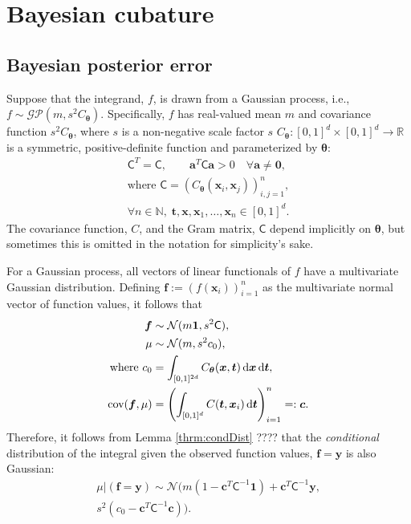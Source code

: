 \documentclass[twocolumn]{svjour3}          %
\newcommand{\bm}[1]{\boldsymbol{#1}}
\newcommand{\dif}[1]{\text{d}{#1}}
\newcommand{\D}[1]{\text{d}{#1}}
\newcommand{\vtheta}{{\bm{\theta}}}
\newcommand{\va}{\bm{a}}
\newcommand{\vc}{\bm{c}}
\newcommand{\vf}{\bm{f}}
\newcommand{\vt}{\bm{t}}
\newcommand{\vx}{\bm{x}}
\newcommand{\vy}{\bm{y}}
\newcommand{\vzero}{\bm{0}}
\newcommand{\vone}{\bm{1}}
\newcommand{\mC}{\mathsf{C}}
\newcommand{\cov}{{\textup{cov}}}
\newcommand{\calN}{\mathcal{N}}
\begin{document}
\section{Bayesian cubature} \label{sec:BC}
\label{sec:1}

\subsection{Bayesian posterior error}
\label{sec:BayesPostErr}

Suppose that the integrand, $f$, is drawn from a Gaussian process, i.e., $f \sim \mathcal{GP}(m,s^2 C_\vtheta)$.  Specifically, $f$ has real-valued mean $m$ and covariance function $s^2C_\vtheta$, where $s$ is a non-negative scale factor $s$ $C_\vtheta: [0,1]^d \times [0,1]^d \to \mathbb{R} $ is a symmetric, positive-definite function and parameterized by $\vtheta$:
\begin{multline} \label{FJH:eq:CondPosDef}
\mC^T = \mC,  \qquad \va^T \mC \va > 0 \quad  \forall \va \ne \vzero, 
\\ \text{where } \mC = \left(  C_\vtheta(\vx_i,\vx_j)  \right)_{i,j=1}^n,\\
\forall n\in \mathbb{N}, \; \vt, \vx, \vx_1, \ldots, \vx_n \in [0,1]^d.
\end{multline}
The covariance function, $C$, and the Gram matrix, $\mC$ depend implicitly on $\vtheta$, but sometimes this is omitted in the notation for simplicity's sake.

For a Gaussian process, all vectors of linear functionals of $f$ have a multivariate Gaussian distribution. Defining  $\vf  := \left( f(\vx_i)\right)_{i=1}^n$ as the multivariate normal vector of function values, it follows that 
\begin{subequations}
\begin{align}
\label{eqn:fGaussDist}
\vf  & \sim \calN(m \vone, s^2 \mC), \\
\mu & \sim \calN(m, s^2 c_0), 
\\
\text{where }
c_0 &= \int_{[0,1]^{2d}} C_\vtheta(\vx,\vt) \, \dif{\vx} \, \dif{\vt}, \\
\cov(\vf, \mu) &= \left(  \int_{[0,1]^d} C(\vt,\vx_i) \, \D \vt \right)_{i=1}^n  =: \vc.
\end{align}
\end{subequations}
Therefore,  it follows from Lemma \ref{thrm:condDist} ???? that the \emph{conditional} distribution of the integral given the observed function values, $\vf = \vy$ is also Gaussian:
\begin{multline} \label{eqn:condInteg}
\mu | (\vf = \vy) \sim \calN \bigl(m (1 - \vc^T \mC^{-1} \vone)  + \vc^T \mC^{-1} \vy, 
\\
s^2(c_0  -\vc ^T \mC^{-1} \vc) \bigr).
\end{multline}
\end{document}
